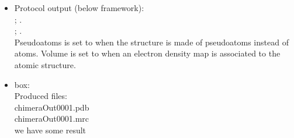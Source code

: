 \begin{itemize}
\begin{itemize}
    \begin{itemize}
     \item Protocol output (below \scipion framework):\\
      ; .\\
      ; .\\Pseudoatoms is set to  when the structure is made of pseudoatoms instead of atoms. Volume is set to  when an electron density map is associated to the atomic structure.\\
     \item {} box:\\Produced files:\\chimeraOut0001.pdb\\chimeraOut0001.mrc\\we have some result\\
    \end{itemize}
    
   \end{itemize}
  
 \end{itemize}


